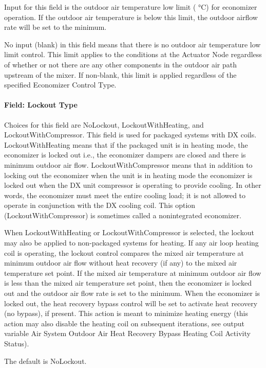 Input for this field is the outdoor air temperature low limit ( °C) for economizer operation. If the outdoor air temperature is below this limit, the outdoor airflow rate will be set to the minimum.

No input (blank) in this field means that there is no outdoor air temperature low limit control. This limit applies to the conditions at the Actuator Node regardless of whether or not there are any other components in the outdoor air path upstream of the mixer. If non-blank, this limit is applied regardless of the specified Economizer Control Type.

\paragraph{Field: Lockout Type}\label{field-lockout-type}

Choices for this field are NoLockout, LockoutWithHeating, and LockoutWithCompressor. This field is used for packaged systems with DX coils. LockoutWithHeating means that if the packaged unit is in heating mode, the economizer is locked out i.e., the economizer dampers are closed and there is minimum outdoor air flow. LockoutWithCompressor means that in addition to locking out the economizer when the unit is in heating mode the economizer is locked out when the DX unit compressor is operating to provide cooling. In other words, the economizer must meet the entire cooling load; it is not allowed to operate in conjunction with the DX cooling coil. This option (LockoutWithCompressor) is sometimes called a nonintegrated economizer.

When LockoutWithHeating or LockoutWithCompressor is selected, the lockout may also be applied to non-packaged systems for heating. If any air loop heating coil is operating, the lockout control compares the mixed air temperature at minimum outdoor air flow without heat recovery (if any) to the mixed air temperature set point. If the mixed air temperature at minimum outdoor air flow is less than the mixed air temperature set point, then the economizer is locked out and the outdoor air flow rate is set to the minimum. When the economizer is locked out, the heat recovery bypass control will be set to activate heat recovery (no bypass), if present. This action is meant to minimize heating energy (this action may also disable the heating coil on subsequent iterations, see output variable Air System Outdoor Air Heat Recovery Bypass Heating Coil Activity Status).

The default is NoLockout.

